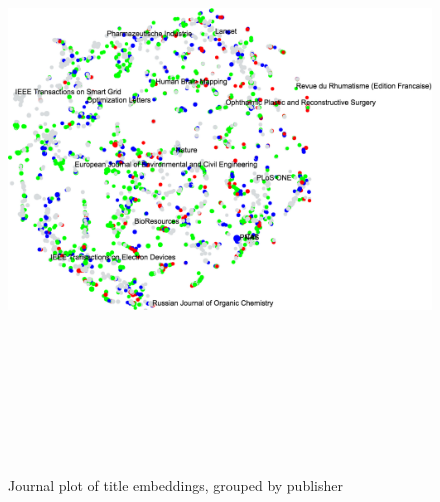 \documentclass[../../paper.tex]{subfiles}
\begin{document}
\begin{landscape}
\begin{figure}
\begin{center}
\includegraphics[height=6.5in]{Plots/Journal_Plots/Title_normal}
\end{center}
\caption{Journal plot of title embeddings, grouped by publisher}\label{figure:titlePlotNormal}
\end{figure}
\end{landscape}
\end{document}
